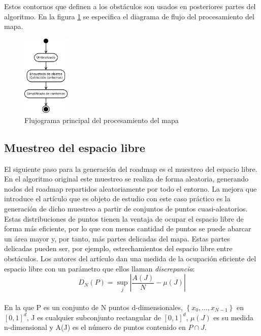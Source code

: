 Estos contornos que definen a los obstáculos son usados en posteriores partes del algoritmo. En la figura \ref{fig:procesado_imagen} se especifica el diagrama de flujo del procesamiento del mapa.\\

\begin{figure}[H]
		\centering
        \includegraphics[width=0.2\textwidth]{images/flujo_imagen.png}
        \caption{Flujograma principal del procesamiento del mapa}
        \label{fig:procesado_imagen}
\end{figure} 

\subsection{Muestreo del espacio libre}

El siguiente paso para la generación del roadmap es el muestreo del espacio libre. En el algoritmo original este muestreo se realiza de forma aleatoria, generando nodos del roadmap repartidos aleatoriamente por todo el entorno. La mejora que introduce el artículo que es objeto de estudio con este caso práctico es la generación de dicho muestreo a partir de conjuntos de puntos cuasi-aleatorios. Estas distribuciones de puntos tienen la ventaja de ocupar el espacio libre de forma más eficiente, por lo que con menos cantidad de puntos se puede abarcar un área mayor y, por tanto, más partes delicadas del mapa. Estas partes delicadas pueden ser, por ejemplo, estrechamientos del espacio libre entre obstáculos. Los autores del artículo dan una medida de la ocupación eficiente del espacio libre con un parámetro que ellos llaman \textit{discrepancia}:\\


 \[ D_N(P) = \sup_{j}{\left| \frac{A(J)}{N} -  \mu(J) \right| }\]\\

En la que P es un conjunto de N puntos d-dimensionales, $\left\lbrace x_0, ... , x_{N-1} \right\rbrace$ en $[0,1]^d$, J es cualquier subconjunto rectangular de $[0,1]^d$, $\mu(J)$ es su medida n-dimensional y A(J) es el número de puntos contenido en $P \cap J$.\\

